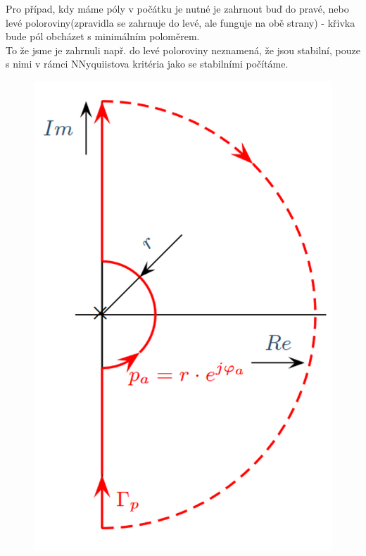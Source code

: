 Pro případ, kdy máme póly v počátku je nutné je zahrnout buď do pravé, nebo levé poloroviny(zpravidla se zahrnuje do levé, ale funguje na obě strany) - křivka bude pól obcházet s minimálním poloměrem.\\
To že jsme je zahrnuli např. do levé poloroviny neznamená, že jsou stabilní, pouze s nimi v rámci NNyquiistova kritéria jako se stabilními počítáme.\\
\begin{figure}[H]
    \includegraphics*[scale = 0.15]{images/NyQuistPocatek.png}
\end{figure}

